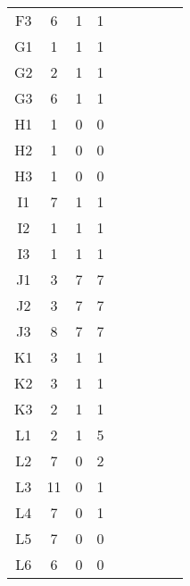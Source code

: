 \begin{center}
\begin{longtable}{ccccc|cccc}
    F3    & 6     & 1     & 1 \\
    G1    & 1     & 1     & 1 \\
    G2    & 2     & 1     & 1 \\
    G3    & 6     & 1     & 1 \\
    H1    & 1     & 0     & 0 \\
    H2    & 1     & 0     & 0 \\
    H3    & 1     & 0     & 0 \\
    I1    & 7     & 1     & 1 \\
    I2    & 1     & 1     & 1 \\
    I3    & 1     & 1     & 1 \\
    J1    & 3     & 7     & 7 \\
    J2    & 3     & 7     & 7 \\
    J3    & 8     & 7     & 7 \\
    K1    & 3     & 1     & 1 \\
    K2    & 3     & 1     & 1 \\
    K3    & 2     & 1     & 1 \\
    L1    & 2     & 1     & 5 \\
    L2    & 7     & 0     & 2 \\
    L3    & 11    & 0     & 1 \\
    L4    & 7     & 0     & 1 \\
    L5    & 7     & 0     & 0 \\
    L6    & 6     & 0     & 0 \\
\end{longtable}
\end{center}

